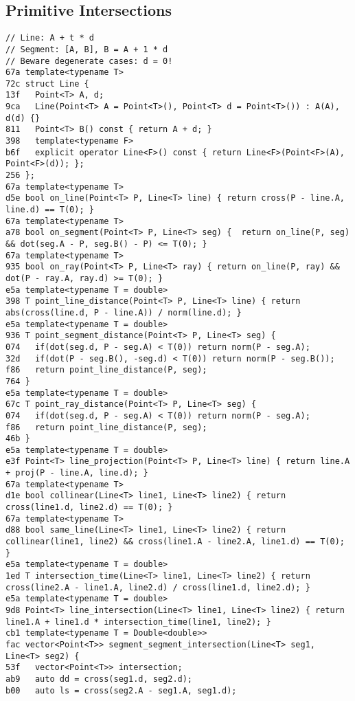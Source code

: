 \documentclass[10pt, a4paper, twoside]{article}
\begin{document}
\subsection{Primitive Intersections}
\begin{lstlisting}
// Line: A + t * d
// Segment: [A, B], B = A + 1 * d
// Beware degenerate cases: d = 0!
67a template<typename T>
72c struct Line {
13f   Point<T> A, d;
9ca   Line(Point<T> A = Point<T>(), Point<T> d = Point<T>()) : A(A), d(d) {}
811   Point<T> B() const { return A + d; }
398   template<typename F>
b6f   explicit operator Line<F>() const { return Line<F>(Point<F>(A), Point<F>(d)); };
256 };
67a template<typename T>
d5e bool on_line(Point<T> P, Line<T> line) { return cross(P - line.A, line.d) == T(0); }
67a template<typename T>
a78 bool on_segment(Point<T> P, Line<T> seg) {  return on_line(P, seg) && dot(seg.A - P, seg.B() - P) <= T(0); }
67a template<typename T>
935 bool on_ray(Point<T> P, Line<T> ray) { return on_line(P, ray) && dot(P - ray.A, ray.d) >= T(0); }
e5a template<typename T = double>
398 T point_line_distance(Point<T> P, Line<T> line) { return abs(cross(line.d, P - line.A)) / norm(line.d); }
e5a template<typename T = double>
936 T point_segment_distance(Point<T> P, Line<T> seg) {
074   if(dot(seg.d, P - seg.A) < T(0)) return norm(P - seg.A);
32d   if(dot(P - seg.B(), -seg.d) < T(0)) return norm(P - seg.B());
f86   return point_line_distance(P, seg);
764 }
e5a template<typename T = double>
67c T point_ray_distance(Point<T> P, Line<T> seg) {
074   if(dot(seg.d, P - seg.A) < T(0)) return norm(P - seg.A);
f86   return point_line_distance(P, seg);
46b }
e5a template<typename T = double>
e3f Point<T> line_projection(Point<T> P, Line<T> line) { return line.A + proj(P - line.A, line.d); }
67a template<typename T>
d1e bool collinear(Line<T> line1, Line<T> line2) { return cross(line1.d, line2.d) == T(0); }
67a template<typename T>
d88 bool same_line(Line<T> line1, Line<T> line2) { return collinear(line1, line2) && cross(line1.A - line2.A, line1.d) == T(0); }
e5a template<typename T = double>
1ed T intersection_time(Line<T> line1, Line<T> line2) { return cross(line2.A - line1.A, line2.d) / cross(line1.d, line2.d); }
e5a template<typename T = double>
9d8 Point<T> line_intersection(Line<T> line1, Line<T> line2) { return line1.A + line1.d * intersection_time(line1, line2); }
cb1 template<typename T = Double<double>>
fac vector<Point<T>> segment_segment_intersection(Line<T> seg1, Line<T> seg2) {
53f   vector<Point<T>> intersection;
ab9   auto dd = cross(seg1.d, seg2.d);
b00   auto ls = cross(seg2.A - seg1.A, seg1.d);

\end{lstlisting}
\end{document}

